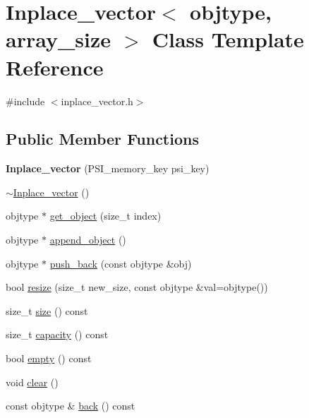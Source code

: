 \hypertarget{classInplace__vector}{}\section{Inplace\+\_\+vector$<$ objtype, array\+\_\+size $>$ Class Template Reference}
\label{classInplace__vector}


{\ttfamily \#include $<$inplace\+\_\+vector.\+h$>$}

\subsection*{Public Member Functions}
\begin{DoxyCompactItemize}
\item 
\mbox{\label{classInplace__vector_a6b7fedc5f8da2eca1e16ba8b22a2edae}} 
{\bfseries Inplace\+\_\+vector} (P\+S\+I\+\_\+memory\+\_\+key psi\+\_\+key)
\item 
\mbox{\hyperlink{classInplace__vector_a82912dffa04001608197c02d330e7cd1}{$\sim$\+Inplace\+\_\+vector}} ()
\item 
objtype $\ast$ \mbox{\hyperlink{classInplace__vector_a798bedb62927bc1f6817fe32ad12c990}{get\+\_\+object}} (size\+\_\+t index)
\item 
objtype $\ast$ \mbox{\hyperlink{classInplace__vector_af9b6fa9a44962ce82429772108446eb7}{append\+\_\+object}} ()
\item 
objtype $\ast$ \mbox{\hyperlink{classInplace__vector_a4f5dd81d586f94279698ee31c496bcc2}{push\+\_\+back}} (const objtype \&obj)
\item 
bool \mbox{\hyperlink{classInplace__vector_a2785143f15f621c9d9ddf53e2b5e136c}{resize}} (size\+\_\+t new\+\_\+size, const objtype \&val=objtype())
\item 
size\+\_\+t \mbox{\hyperlink{classInplace__vector_aa24e13ea5106489e799fe97512227da0}{size}} () const
\item 
size\+\_\+t \mbox{\hyperlink{classInplace__vector_a7413b782c30385c34355aa8845c2d00f}{capacity}} () const
\item 
bool \mbox{\hyperlink{classInplace__vector_a611ca3f3274eab27b302cb0e0b06e83c}{empty}} () const
\item 
void \mbox{\hyperlink{classInplace__vector_a64cc6a796c6d07205f2436c357bc1a0d}{clear}} ()
\item 
const objtype \& \mbox{\hyperlink{classInplace__vector_acf8cb3ab1ea491f3466c90be7db6cd25}{back}} () const

\end{DoxyCompactItemize}
